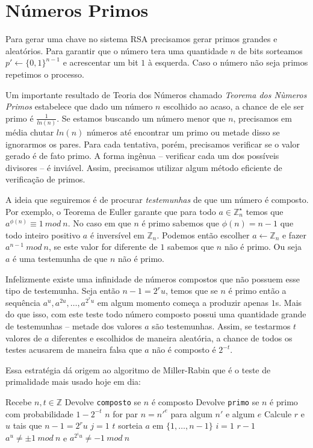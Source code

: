 \chapter{Números Primos}
\label{cha:primos}

Para gerar uma chave no sistema RSA precisamos gerar primos grandes e aleatórios.
Para garantir que o número tera uma quantidade $n$ de bits sorteamos $p' \leftarrow \{0,1\}^{n-1}$ e acrescentar um bit $1$ à esquerda.
Caso o número não seja primos repetimos o processo.

Um importante resultado de Teoria dos Números chamado {\em Teorema dos Nùmeros Primos} estabelece que dado um número $n$ escolhido ao acaso, a chance de ele ser primo é $\frac{1}{ln(n)}$.
Se estamos buscando um número menor que $n$, precisamos em média chutar $ln(n)$ números até encontrar um primo ou metade disso se ignorarmos os pares.
Para cada tentativa, porém, precisamos verificar se o valor gerado é de fato primo.
A forma ingênua -- verificar cada um dos possíveis divisores -- é inviável.
Assim, precisamos utilizar algum método eficiente de verificação de primos.

A ideia que seguiremos é de procurar {\em testemunhas} de que um número é composto.
Por exemplo, o Teorema de Euller garante que para todo $a \in \mathbb{Z}_n^\star$ temos que $a^{\phi(n)} \equiv 1\ mod\ n$.
No caso em que $n$ é primo sabemos que $\phi(n) = n - 1$ que todo inteiro positivo $a$ é inversível em $\mathbb{Z}_n$.
Podemos então escolher $a \leftarrow \mathbb{Z}_n$ e fazer $a^{n-1}\ mod\ n$, se este valor for diferente de $1$ sabemos que $n$ não é primo.
Ou seja $a$ é uma testemunha de que $n$ não é primo.

Infelizmente existe uma infinidade de números compostos que não possuem esse tipo de testemunha.
Seja então $n - 1 = 2^ru$, temos que se $n$ é primo então a sequência $a^u, a^{2u}, \dots, a^{2^ru}$ em algum momento começa a produzir apenas $1$s.
Mais do que isso, com este teste todo número composto possui uma quantidade grande de testemunhas -- metade dos valores $a$ são testemunhas.
Assim, se testarmos $t$ valores de $a$ diferentes e escolhidos de maneira aleatória, a chance de todos os testes acusarem de maneira falsa que $a$ não é composto é $2^{-t}$.

Essa estratégia dá origem ao algoritmo de Miller-Rabin \cite{Miller75,Rabin80} que é o teste de primalidade mais usado hoje em dia:

\begin{codebox}
\li \Comment Recebe $n, t \in \mathbb{Z}$
\li \Comment Devolve {\tt composto} se $n$ é composto
\li \Comment Devolve {\tt primo} se $n$ é primo com probabilidade $1 - 2^{-t}$
\li \If $n$ for par
\li   \Then {}
    \End
\li \If $n = n'^e$ para algum $n'$ e algum $e$
\li   \Then {}
    \End
\li  Calcule $r$ e $u$ tais que $n-1 = 2^ru$
\li \For $j = 1$ \To $t$
\li   \Do sorteia $a$ em $\{1, \dots, n-1\}$ 
\li   \For $i = 1$ \To $r-1$
\li     \Do \If $a^u \neq \pm 1\ mod\ n$ e $a^{2^iu} \neq -1\ mod\ n$
\li         \Then {}
            \End
      \End
    \End
\li {}
\end{codebox}


